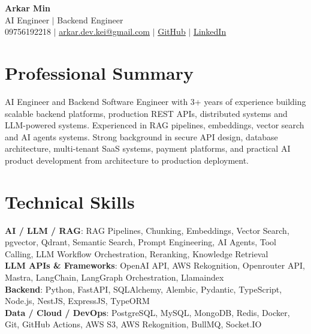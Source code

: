 \documentclass[letterpaper,11pt]{article}
\begin{document}
\begin{center}
    \textbf{\LARGE Arkar Min} \\ \vspace{2pt}
    \small AI Engineer $|$ Backend Engineer \\ \vspace{1pt}
    \small 09756192218 $|$ \href{mailto:arkar.dev.kei@gmail.com}{\underline{arkar.dev.kei@gmail.com}} $|$
    \href{https://github.com/arkarmin-gg}{\underline{GitHub}} $|$
    \href{https://www.linkedin.com/in/arkar-min-97410b308/}{\underline{LinkedIn}}
\end{center}

\section{Professional Summary}
\small{AI Engineer and Backend Software Engineer with 3+ years of experience building scalable backend platforms, production REST APIs, distributed systems and LLM-powered systems. Experienced in RAG pipelines, embeddings, vector search and AI agents systems. Strong background in secure API design, database architecture, multi-tenant SaaS systems, payment platforms, and practical AI product development from architecture to production deployment.}

\section{Technical Skills}
\begin{itemize}[leftmargin=0.15in, label={}]
    \small{\item{
     \textbf{AI / LLM / RAG}{: RAG Pipelines, Chunking, Embeddings, Vector Search, pgvector, Qdrant, Semantic Search, Prompt Engineering, AI Agents, Tool Calling, LLM Workflow Orchestration, Reranking, Knowledge Retrieval} \\
     \textbf{LLM APIs \& Frameworks}{: OpenAI API, AWS Rekognition, Openrouter API, Mastra, LangChain, LangGraph Orchestration, Llamaindex} \\
     \textbf{Backend}{: Python, FastAPI, SQLAlchemy, Alembic, Pydantic, TypeScript, Node.js, NestJS, ExpressJS, TypeORM} \\
     \textbf{Data / Cloud / DevOps}{: PostgreSQL, MySQL, MongoDB, Redis, Docker, Git, GitHub Actions, AWS S3, AWS Rekognition, BullMQ, Socket.IO}
    }}
\end{itemize}
\end{document}
